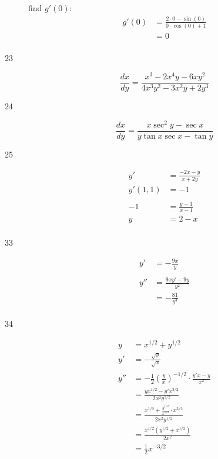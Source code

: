 \documentclass[letterpaper, landscape]{exam}
\begin{document}
\begin{description}
      find $g'(0)$:
      \begin{align*}
        g'(0) & = \frac{2 \cdot 0 - \sin (0) }{0 \cdot \cos (0) + 1} \\
              & = \boxed{ 0 } \\
      \end{align*}

    \item[23] 
      \[
        \frac{dx}{dy} = \frac{ x^3 - 2x^4y - 6xy^2 }{ 4x^3y^2 - 3x^2y + 2y^3 }
      \]

    \item[24] 
      \[
        \frac{dx}{dy} = \frac{x \sec^2 y - \sec x}{y \tan x \sec x - \tan y}
      \]

    \item[25] 
      \begin{align*}
        y'       & = \frac{ - 2x - y}{x + 2 y} \\
        y'(1, 1) & = -1 \\
        \\
        -1       & = \frac{y - 1}{x - 1} \\
        y        & = 2 - x \\
      \end{align*}

    \item[33]
      \begin{align*}
        y'  & = - \frac{9x}{y} \\
        \\
        y'' & = \frac{9xy' - 9y}{y^2} \\
            & = \boxed{ - \frac{81}{y^3} } \\
      \end{align*}

    \item[34] 
      \begin{align*}
        y   & = x^{1/2} + y^{1/2} \\
        y'  & = - \frac{\sqrt{y}}{\sqrt{x}} \\
        y'' & = - \frac{1}{2} \left( \frac{y}{x} \right)^{-1/2} \cdot \frac{y'x - y}{x^2} \\
            & =  \frac{yx^{1/2} - y'x^{3/2}}{2x^2y^{1/2}} \\
            & = \frac{ x^{1/2} + \frac{ y^{1/2} }{ x^{1/2} } \cdot x^{3/2} }{ 2x^2y^{1/2} } \\
            & = \frac{x^{1/2} \left( y^{1/2} + x^{1/2} \right)}{2x^2} \\
            & = \boxed{ \frac{1}{2} x^{-3/2} } \\
      \end{align*}


\end{description}
\end{document}

